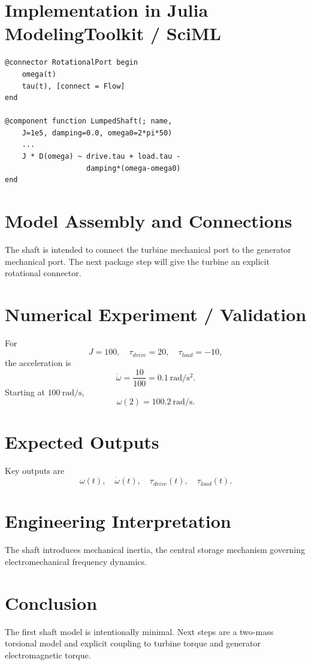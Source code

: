 \documentclass[11pt,a4paper]{article}
\begin{document}
\section{Implementation in Julia ModelingToolkit / SciML}
\begin{lstlisting}
@connector RotationalPort begin
    omega(t)
    tau(t), [connect = Flow]
end

@component function LumpedShaft(; name,
    J=1e5, damping=0.0, omega0=2*pi*50)
    ...
    J * D(omega) ~ drive.tau + load.tau -
                   damping*(omega-omega0)
end
\end{lstlisting}

\section{Model Assembly and Connections}
The shaft is intended to connect the turbine mechanical port to the generator mechanical port. The next package step will give the turbine an explicit rotational connector.

\section{Numerical Experiment / Validation}
For
\[
J=100,\quad\tau_{drive}=20,\quad\tau_{load}=-10,
\]
the acceleration is
\[
\dot\omega=\frac{10}{100}=0.1~\si{\radian\per\second\squared}.
\]
Starting at $100~\si{\radian\per\second}$,
\[
\boxed{\omega(2)=100.2~\si{\radian\per\second}}.
\]

\section{Expected Outputs}
Key outputs are
\[
\omega(t),\quad\dot\omega(t),\quad\tau_{drive}(t),\quad\tau_{load}(t).
\]

\section{Engineering Interpretation}
The shaft introduces mechanical inertia, the central storage mechanism governing electromechanical frequency dynamics.

\section*{Conclusion}
The first shaft model is intentionally minimal. Next steps are a two-mass torsional model and explicit coupling to turbine torque and generator electromagnetic torque.
\end{document}
